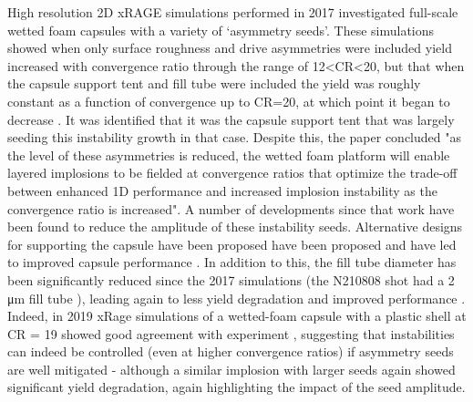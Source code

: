 High resolution 2D xRAGE simulations performed in 2017 investigated full-scale wetted foam capsules with a variety of `asymmetry seeds'. These simulations showed when only surface roughness and drive asymmetries were included yield increased with convergence ratio through the range of 12<CR<20, but  that when the capsule support tent and fill tube were included the yield was roughly constant as a function of convergence up to CR=20, at which point it began to decrease \cite{Haines2017a}. It was identified that it was the capsule support tent that was largely seeding this instability growth in that case. Despite this, the paper concluded "as the level of these asymmetries is reduced, the wetted foam platform will enable layered implosions to be fielded at convergence ratios that optimize the trade-off between enhanced 1D performance and increased implosion instability as the convergence ratio is increased". A number of developments since that work have been found to reduce the amplitude of these instability seeds. Alternative designs for supporting the capsule have been proposed have been proposed \cite{Weber2017, Hammel2018a} and have led to improved capsule performance \cite{Hammel2018a}. In addition to this, the fill tube diameter has been significantly reduced since the 2017 simulations (the N210808 shot had a 2 \unit{\micro\meter} fill tube \cite{Abu-Shawareb2022}), leading again to less yield degradation and improved performance \cite{Weber2020, Pak2020}. Indeed, in 2019 xRage simulations of a wetted-foam capsule with a plastic shell at CR = 19 showed good agreement with experiment \cite{Haines2019a}, suggesting that instabilities can indeed be controlled (even at higher convergence ratios) if asymmetry seeds are well mitigated - although a similar implosion with larger seeds again showed significant yield degradation, again highlighting the impact of the seed amplitude.

